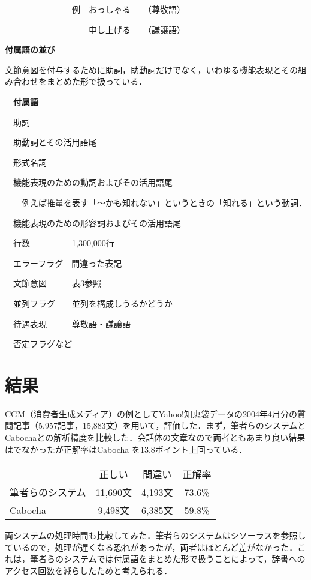 \documentclass[japanese]{jnlp_1.4}
\begin{document}
　　　　　　　　例　おっしゃる　　（尊敬語）

　　　　　　　　　　申し上げる　　（謙譲語）

{\bfseries 付属語の並び}

文節意図を付与するために助詞，助動詞だけでなく，いわゆる機能表現とその組み合わせをまとめた形で扱っている．

　{\bfseries 付属語}

　助詞

　助動詞とその活用語尾

　形式名詞

　機能表現のための動詞およびその活用語尾

　　例えば推量を表す「〜かも知れない」というときの「知れる」という動詞．

　機能表現のための形容詞およびその活用語尾

　行数　　　　　1,300,000行

　エラーフラグ　間違った表記

　文節意図　　　表3参照

　並列フラグ　　並列を構成しうるかどうか

　待遇表現　　　尊敬語・謙譲語

　否定フラグなど




\section{結果}

CGM（消費者生成メディア）の例としてYahoo!知恵袋データの2004年4月分の質問記事（5,957記事，15,883文）を用いて，評価した．まず，筆者らのシステムとCabochaとの解析精度を比較した．会話体の文章なので両者ともあまり良い結果はでなかったが正解率はCabocha を13.8ポイント上回っている．

\vspace{0.3zw}
\begin{tabular}{lccc}
	& 正しい & 間違い & 正解率 \\
筆者らのシステム & 11,690文 & 4,193文 & 73.6\% \\
Cabocha & \phantom{0}9,498文 & 6,385文 & 59.8\%
\end{tabular}
\vspace{0.3zw}

両システムの処理時間も比較してみた．筆者らのシステムはシソーラスを参照しているので，処理が遅くなる恐れがあったが，両者はほとんど差がなかった．これは，筆者らのシステムでは付属語をまとめた形で扱うことによって，辞書へのアクセス回数を減らしたためと考えられる．
\end{document}
